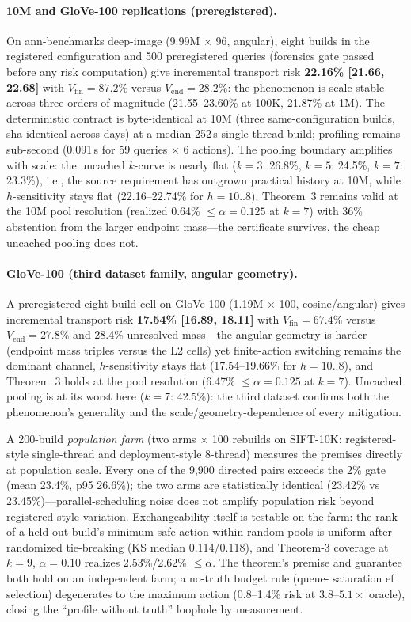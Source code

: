 \documentclass{article}
\begin{document}
\paragraph{10M and GloVe-100 replications (preregistered).}
On ann-benchmarks deep-image (9.99M $\times$ 96, angular), eight builds in the registered
configuration and 500 preregistered queries (forensics gate passed before any risk
computation) give incremental transport risk \textbf{22.16\% [21.66, 22.68]} with
$V_{\mathrm{fin}}{=}87.2\%$ versus $V_{\mathrm{end}}{=}28.2\%$: the phenomenon is
scale-stable across three orders of magnitude (21.55--23.60\% at 100K, 21.87\% at 1M).
The deterministic contract is byte-identical at 10M (three same-configuration builds,
sha-identical across days) at a median 252\,s single-thread build; profiling remains
sub-second (0.091\,s for 59 queries $\times$ 6 actions). The pooling boundary amplifies
with scale: the uncached $k$-curve is nearly flat ($k{=}3$: 26.8\%, $k{=}5$: 24.5\%, $k{=}7$:
23.3\%), i.e., the source requirement has outgrown practical history at 10M, while
$h$-sensitivity stays flat (22.16--22.74\% for $h{=}10{..}8$). Theorem~3 remains valid at the 10M
pool resolution (realized 0.64\% $\le\alpha{=}0.125$ at $k{=}7$) with 36\% abstention from the
larger endpoint mass---the certificate survives, the cheap uncached pooling does not.

\paragraph{GloVe-100 (third dataset family, angular geometry).}
A preregistered eight-build cell on GloVe-100 (1.19M $\times$ 100, cosine/angular) gives incremental
transport risk \textbf{17.54\% [16.89, 18.11]} with $V_{\mathrm{fin}}{=}67.4\%$ versus
$V_{\mathrm{end}}{=}27.8\%$ and 28.4\% unresolved mass---the angular geometry is harder (endpoint
mass triples versus the L2 cells) yet finite-action switching remains the dominant channel,
$h$-sensitivity stays flat (17.54--19.66\% for $h{=}10{..}8$), and Theorem~3 holds at the pool
resolution (6.47\% $\le\alpha{=}0.125$ at $k{=}7$). Uncached pooling is at its worst here
($k{=}7$: 42.5\%): the third dataset confirms both the phenomenon's generality and the
scale/geometry-dependence of every mitigation.

A 200-build \emph{population farm} (two arms $\times$ 100 rebuilds on SIFT-10K: registered-style
single-thread and deployment-style 8-thread) measures the premises directly at population scale. Every one
of the 9{,}900 directed pairs exceeds the 2\% gate (mean 23.4\%, p95 26.6\%); the two arms are
statistically identical (23.42\% vs 23.45\%)---parallel-scheduling noise does not amplify population risk
beyond registered-style variation. Exchangeability itself is testable on the farm: the rank of a held-out
build's minimum safe action within random pools is uniform after randomized tie-breaking (KS median
0.114/0.118), and Theorem-3 coverage at $k{=}9$, $\alpha{=}0.10$ realizes 2.53\%/2.62\% $\le\alpha$.
The theorem's premise and guarantee both hold on an independent farm; a no-truth budget rule (queue-
saturation ef selection) degenerates to the maximum action (0.8--1.4\% risk at $3.8$--$5.1\times$ oracle),
closing the ``profile without truth'' loophole by measurement.
\end{document}
